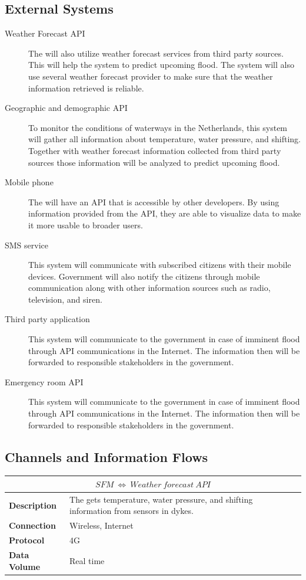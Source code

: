 \subsection{External Systems}
\begin{description}
	\item[Weather Forecast API] The \ProjectName{} will also utilize weather forecast services from third party sources. This will help the system to predict upcoming flood. The system will also use several weather forecast provider to make sure that the weather information retrieved is reliable.
	\item[Geographic and demographic API] To monitor the conditions of waterways in the Netherlands, this system will gather all information about temperature, water pressure, and shifting. Together with weather forecast information collected from third party sources those information will be analyzed to predict upcoming flood.
	\item[Mobile phone] The \ProjectName{} will have an API that is accessible by other developers. By using information provided from the API, they are able to visualize data to make it more usable to broader users. 
	\item[SMS service] This system will communicate with subscribed citizens with their mobile devices. Government will also notify the citizens through mobile communication along with other information sources such as radio, television, and siren.
	\item[Third party application] This system will communicate to the government in case of imminent flood through API communications in the Internet. The information then will be forwarded to responsible stakeholders in the government.
	\item[Emergency room API] This system will communicate to the government in case of imminent flood through API communications in the Internet. The information then will be forwarded to responsible stakeholders in the government.
\end{description}

\subsection{Channels and Information Flows}
\begin{table}[!htbp]
	\centering
    \begin{tabular}{L{} L{}}
    \toprule
     \\ \midrule
    \textbf{Description} & The \ProjectName{} gets temperature, water pressure, and shifting information from sensors in dykes. \\
    \textbf{Connection} & Wireless, Internet \\
    \textbf{Protocol} & 4G \\
    \textbf{Data Volume} & Real time \\
    \bottomrule
    \end{tabular}
\end{table}


